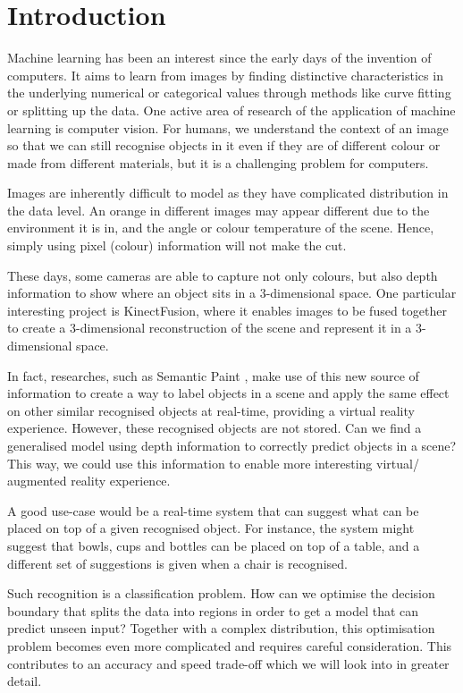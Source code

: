 \chapter{Introduction} \label{chap:introduction}
Machine learning has been an interest since the early days of the invention of computers. It aims to learn from images by finding distinctive characteristics in the underlying numerical or categorical values through methods like curve fitting or splitting up the data. One active area of research of the application of machine learning is computer vision. For humans, we understand the context of an image so that we can still recognise objects in it even if they are of different colour or made from different materials, but it is a challenging problem for computers. 

Images are inherently difficult to model as they have complicated distribution in the data level. An orange in different images may appear different due to the environment it is in, and the angle or colour temperature of the scene. Hence, simply using pixel (colour) information will not make the cut.

These days, some cameras are able to capture not only colours, but also depth information to show where an object sits in a 3-dimensional space. One particular interesting project is KinectFusion, where it enables images to be fused together to create a 3-dimensional reconstruction of the scene and represent it in a 3-dimensional space.

In fact, researches, such as Semantic Paint \cite{semantic-paint}, make use of this new source of information to create a way to label objects in a scene and apply the same effect on other similar recognised objects at real-time, providing a virtual reality experience. However, these recognised objects are not stored. Can we find a generalised model using depth information to correctly predict objects in a scene? This way, we could use this information to enable more interesting virtual/ augmented reality experience. 

A good use-case would be a real-time system that can suggest what can be placed on top of a given recognised object. For instance, the system might suggest that bowls, cups and bottles can be placed on top of a table, and a different set of suggestions is given when a chair is recognised. 

Such recognition is a classification problem. How can we optimise the decision boundary that splits the data into regions in order to get a model that can predict unseen input? Together with a complex distribution, this optimisation problem becomes even more complicated and requires careful consideration. This contributes to an accuracy and speed trade-off which we will look into in greater detail.


